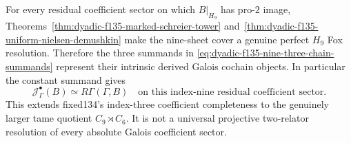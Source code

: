 \begin{theorem}
For every residual
coefficient sector
on which $B|_{H_9}$
has pro-$2$ image,
Theorems~\ref{thm:dyadic-f135-marked-schreier-tower}
and~\ref{thm:dyadic-f135-uniform-nielsen-demushkin}
make the nine-sheet
cover a genuine
perfect $H_9$
Fox resolution.
Therefore the
three summands in
\eqref{eq:dyadic-f135-nine-three-chain-summands}
represent their
intrinsic derived
Galois cochain
objects.  In
particular the
constant summand
gives
\begin{equation}\label{eq:dyadic-f135-nine-full-marked-sector-completeness}
\boxed{\quad
\mathcal J_\Gamma^\bullet(B)
\simeq R\Gamma(\Gamma,B)
\quad\text{on this
index-nine residual
coefficient sector}.
\quad}
\end{equation}
This extends
fixed134's
index-three
coefficient completeness
to the genuinely
larger tame quotient
$C_9\rtimes C_6$.
It is not a
universal projective
two-relator resolution
of every absolute
Galois coefficient
sector.
\end{theorem}


